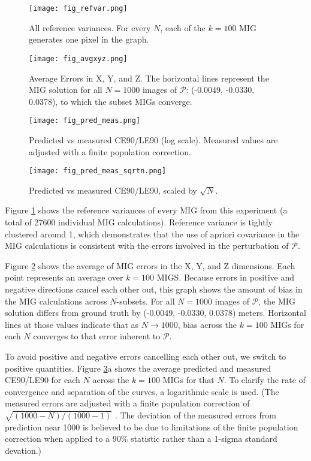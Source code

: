 \documentclass[10pt]{amsart}
\newcommand{\Pimg}{\mathcal{P}}
\begin{document}
\begin{figure}
\texttt{[image: fig\_refvar.png]}
\caption{\label{fig:vanillaref}All reference variances. For every $N$, each of
  the $k=100$ MIG generates one pixel in the graph.}
\end{figure}

\begin{figure}
\texttt{[image: fig\_avgxyz.png]}
\caption{\label{fig:vanillaxyz}Average Errors in X, Y, and Z. The horizontal
  lines represent the MIG solution for all $N=1000$ images of $\Pimg$: (-0.0049,
  -0.0330, 0.0378), to which the subset MIGs converge.}
\end{figure}

\begin{figure}
\texttt{[image: fig\_pred\_meas.png]}
\caption{\label{fig:vanilla_pred_meas}Predicted vs measured CE90/LE90 (log
  scale). Measured values are adjusted with a finite population correction.}
\end{figure}

\begin{figure}
\texttt{[image: fig\_pred\_meas\_sqrtn.png]}
\caption{\label{fig:vanilla_pred_meas_sqrtn}Predicted vs measured CE90/LE90,
  scaled by $\sqrt{N}$.}
\end{figure}

Figure \ref{fig:vanillaref} shows the reference variances of every MIG from this
experiment (a total of 27600 individual MIG calculations). Reference variance is
tightly clustered around 1, which demonstrates that the use of apriori
covariance in the MIG calculations is consistent with the errors involved in the
perturbation of $\Pimg$.

Figure \ref{fig:vanillaxyz} shows the average of MIG errors in the X, Y, and Z
dimensions. Each point represents an average over $k=100$ MIGS. Because errors
in positive and negative directions cancel each other out, this graph shows the
amount of bias in the MIG calculations across $N$-subsets. For all $N=1000$
images of $\Pimg$, the MIG solution differs from ground truth by (-0.0049,
-0.0330, 0.0378) meters. Horizontal lines at those values indicate that as
$N\rightarrow 1000$, bias across the $k=100$ MIGs for each $N$ converges to that
error inherent to $\Pimg$.

To avoid positive and negative errors cancelling each other out, we switch to
positive quantities. Figure \ref{fig:vanilla_pred_meas}a shows the average
predicted and measured CE90/LE90 for each $N$ across the $k=100$ MIGs for that
$N$. To clarify the rate of convergence and separation of the curves, a
logarithmic scale is used. (The measured errors are adjusted with a finite
population correction of $\sqrt{(1000-N)/(1000-1)}$ \cite{FPC}. The deviation of
the measured errors from prediction near 1000 is believed to be due to
limitations of the finite population correction when applied to a 90\% statistic
rather than a 1-sigma standard devation.)
\end{document}
